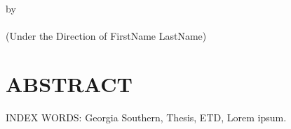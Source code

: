 \begin{center}
    \MyTitle \\
    by\\
    \MyAuthor \\
    (Under the Direction of FirstName LastName)
\end{center}


\begingroup
\renewcommand{\clearpage}{}
\singlespacing


\chapter*{ABSTRACT}

\noindent
\lipsum[1-1] 


\noindent
INDEX WORDS: Georgia Southern, Thesis, ETD, Lorem ipsum.

\thispagestyle{empty}
\endgroup



